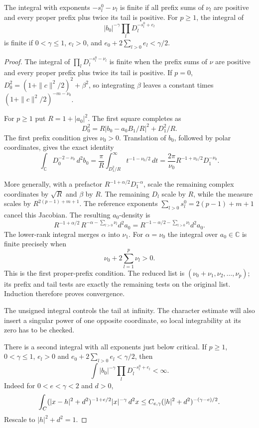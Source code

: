 \begin{lemma}\label{lem:heisenberg-integrability}
The integral with exponents \(-s_l^0-\nu_l\) is finite
if all prefix sums of \(\nu_l\) are positive and every
proper prefix plus twice its tail is positive.
For \(p\ge1\), the integral of
\[
 |b_0|^{-\gamma}\prod_l D_l^{-s_l^0+e_l}
\]
is finite if \(0<\gamma\le1\), \(e_l>0\), and
\(e_0+2\sum_{l>0}e_l<\gamma/2\).
\end{lemma}

\begin{proof}
The integral of
\(\prod_l D_l^{-s_l^0-\nu_l}\) is finite when the
prefix sums of \(\nu\) are positive and every proper
prefix plus twice its tail is positive. If \(p=0\),
\(D_0^2=(1+\|c\|^2/2)^2+\beta^2\), so integrating \(\beta\)
leaves a constant times \((1+\|c\|^2/2)^{-m-\nu_0}\).

For \(p\ge1\) put \(R=1+|a_0|^2\). The first square completes as
\[
 D_0^2=R|b_0-a_0B_1/R|^2+D_1^2/R .
\]
The first prefix condition gives \(\nu_0>0\). Translation
of \(b_0\), followed by polar coordinates, gives the exact identity
\[
 \int_{\mathbb C}D_0^{-2-\nu_0}\,d^2b_0
  =\frac{\pi}{R}\int_{D_1^2/R}^{\infty} t^{-1-\nu_0/2}\,dt
  =\frac{2\pi}{\nu_0}R^{-1+\nu_0/2}D_1^{-\nu_0}.
\]

More generally, with a prefactor
\(R^{-1+\alpha/2}D_1^{-\alpha}\), scale the remaining
complex coordinates by \(\sqrt R\) and \(\beta\) by \(R\).
The remaining \(D_l\) scale by \(R\), while the measure
scales by \(R^{2(p-1)+m+1}\). The reference exponents
\(\sum_{l>0}s_l^0=2(p-1)+m+1\) cancel this Jacobian.
The resulting \(a_0\)-density is
\[
 R^{-1+\alpha/2}\,R^{-\alpha-\sum_{l>0}\nu_l}d^2a_0
   =R^{-1-\alpha/2-\sum_{l>0}\nu_l}d^2a_0 .
\]
The lower-rank integral merges \(\alpha\) into \(\nu_1\).
For \(\alpha=\nu_0\) the integral over \(a_0\in\mathbb C\) is
finite precisely when
\[
             \nu_0+2\sum_{l=1}^p\nu_l>0.
\]
This is the first proper-prefix condition. The reduced list is
\((\nu_0+\nu_1,\nu_2,\ldots,\nu_p)\); its prefix and tail tests
are exactly the remaining tests on the original list. Induction
therefore proves convergence.


The unsigned integral controls the tail at infinity. The character estimate will also insert a singular power of one opposite coordinate, so local integrability at its zero has to be checked.


There is a second integral with all exponents just below
critical. If \(p\ge1\), \(0<\gamma\le1\), \(e_l>0\) and
\(e_0+2\sum_{l>0}e_l<\gamma/2\), then
\[
  \int |b_0|^{-\gamma}\prod_l D_l^{-s_l^0+e_l}<\infty .
\]
Indeed for \(0<e<\gamma<2\) and \(d>0\),
\[
 \int_{C} (|x-h|^2+d^2)^{-1+e/2}|x|^{-\gamma}\,d^2x
 \le C_{e,\gamma} (|h|^2+d^2)^{-(\gamma-e)/2}.
\]
Rescale to \(|h|^2+d^2=1\).


\end{proof}
